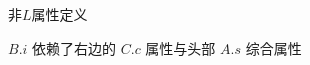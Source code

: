 \begin{frame}{}
  \begin{center}
    非$L$属性定义

    \vspace{0.80cm}
    $B.i$ 依赖了右边的 $C.c$ 属性与头部 $A.s$ 综合属性
  \end{center}
\end{frame}









